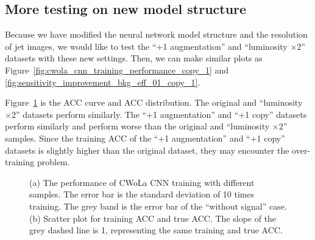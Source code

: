 \documentclass[12pt]{article}
\begin{document}
    \subsection{More testing on new model structure}%
    \label{sub:more_testing_on_new_model_structure}
        Because we have modified the neural network model structure and the resolution of jet images, we would like to test the ``+1 augmentation'' and ``luminosity $\times 2$'' datasets with these new settings. Then, we can make similar plots as Figure~\ref{fig:cwola_cnn_training_performance_copy_1} and \ref{fig:sensitivity_improvement_bkg_eff_01_copy_1}.

        Figure~\ref{fig:cwola_cnn_training_performance_aug_1_x2_copy_1_res_25} is the ACC curve and ACC distribution. The original and ``luminosity $\times 2$'' datasets perform similarly. The ``+1 augmentation'' and ``+1 copy'' datasets perform similarly and perform worse than the original and ``luminosity $\times 2$'' samples. Since the training ACC of the ``+1 augmentation'' and ``+1 copy'' datasets is slightly higher than the original dataset, they may encounter the over-training problem.
        \begin{figure}[htpb]
            \centering
            \caption{(a) The performance of CWoLa CNN training with different samples. The error bar is the standard deviation of 10 times training. The grey band is the error bar of the ``without signal'' case. (b) Scatter plot for training ACC and true ACC. The slope of the grey dashed line is 1, representing the same training and true ACC.}
            \label{fig:cwola_cnn_training_performance_aug_1_x2_copy_1_res_25}
        \end{figure}
\end{document}
